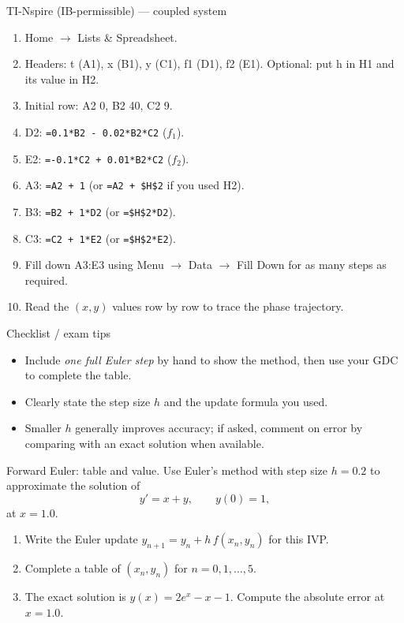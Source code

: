 \documentclass[11pt]{article}
\def\textbf#1{#1}%
\def\texttt#1{#1}%
\newcounter{question}
\begin{document}
\textbf{TI-Nspire (IB-permissible) — coupled system}
\begin{enumerate}
  \item \textbf{Home} $\rightarrow$ \textbf{Lists \& Spreadsheet}.
  \item Headers: \texttt{t} (A1), \texttt{x} (B1), \texttt{y} (C1), \texttt{f1} (D1), \texttt{f2} (E1). Optional: put \texttt{h} in H1 and its value in H2.
  \item Initial row: A2 \texttt{0}, B2 \texttt{40}, C2 \texttt{9}.
  \item D2: \verb|=0.1*B2 - 0.02*B2*C2| \quad($f_1$).
  \item E2: \verb|=-0.1*C2 + 0.01*B2*C2| \quad($f_2$).
  \item A3: \verb|=A2 + 1| \quad(or \verb|=A2 + $H$2| if you used H2).
  \item B3: \verb|=B2 + 1*D2| \quad(or \verb|=$H$2*D2|).
  \item C3: \verb|=C2 + 1*E2| \quad(or \verb|=$H$2*E2|).
  \item Fill down A3:E3 using \textbf{Menu} $\rightarrow$ \textbf{Data} $\rightarrow$ \textbf{Fill Down} for as many steps as required.
  \item Read the $(x,y)$ values row by row to trace the phase trajectory.
\end{enumerate}

\textbf{Checklist / exam tips}
\begin{itemize}
  \item Include \emph{one full Euler step} by hand to show the method, then use your GDC to complete the table.
  \item Clearly state the step size $h$ and the update formula you used.
  \item Smaller $h$ generally improves accuracy; if asked, comment on error by comparing with an exact solution when available.
\end{itemize}



\begin{question}
\textbf{Forward Euler: table and value.}
Use Euler’s method with step size $h=0.2$ to approximate the solution of
\[
y' = x+y,\qquad y(0)=1,
\]
at $x=1.0$. 
\begin{enumerate}
  \item Write the Euler update $y_{n+1}=y_n+h\,f(x_n,y_n)$ for this IVP.
  \item Complete a table of $(x_n,y_n)$ for $n=0,1,\dots,5$.
  \item The exact solution is $y(x)=2e^{x}-x-1$. Compute the absolute error at $x=1.0$.
\end{enumerate}
\end{question}
\end{document}
